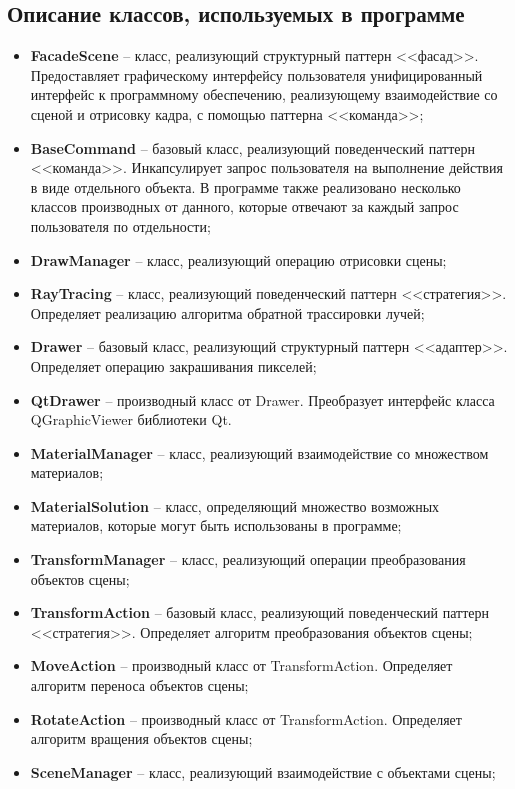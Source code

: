 \subsection{Описание классов, используемых в программе}
\begin{itemize}
	\item \textbf{FacadeScene} -- класс, реализующий структурный паттерн <<фасад>>. Предоставляет графическому интерфейсу пользователя унифицированный интерфейс к программному обеспечению, реализующему взаимодействие со сценой и отрисовку кадра, с помощью паттерна <<команда>>;
	\item \textbf{BaseCommand} -- базовый класс, реализующий поведенческий паттерн <<команда>>. Инкапсулирует запрос пользователя на выполнение действия в виде отдельного объекта. В программе также реализовано несколько классов производных от данного, которые отвечают за каждый запрос пользователя по отдельности;
	\item \textbf{DrawManager} -- класс, реализующий операцию отрисовки сцены;
	\item \textbf{RayTracing} -- класс, реализующий поведенческий паттерн <<стратегия>>. Определяет реализацию алгоритма обратной трассировки лучей;
	\item \textbf{Drawer} -- базовый класс, реализующий структурный паттерн <<адаптер>>. Определяет операцию закрашивания пикселей;
	\item \textbf{QtDrawer} -- производный класс от Drawer. Преобразует интерфейс класса QGraphicViewer библиотеки Qt.
	\item \textbf{MaterialManager} -- класс, реализующий взаимодействие со множеством материалов;
	\item \textbf{MaterialSolution} -- класс, определяющий множество возможных материалов, которые могут быть использованы в программе;
	\item \textbf{TransformManager} -- класс, реализующий операции преобразования объектов сцены;
	\item \textbf{TransformAction} -- базовый класс, реализующий поведенческий паттерн <<стратегия>>. Определяет алгоритм преобразования объектов сцены;
	\item \textbf{MoveAction} -- производный класс от TransformAction. Определяет алгоритм переноса объектов сцены;
	\item \textbf{RotateAction} -- производный класс от TransformAction. Определяет алгоритм вращения объектов сцены;
	\item \textbf{SceneManager} -- класс, реализующий взаимодействие с объектами сцены;

\end{itemize}
